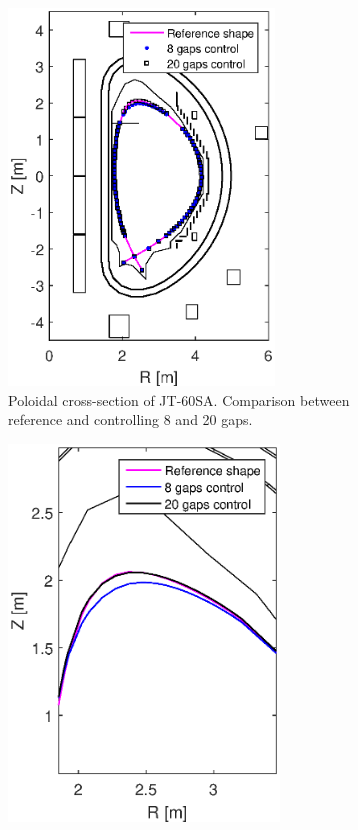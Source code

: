 \begin{figure}[h]
	\centering
	\begin{subfigure}[b]{0.33\textwidth}
		\includegraphics[trim={1.0cm 0cm 1.0cm 0cm},clip,height=10.0cm] {Chp3/Ref_20gaps_8gaps_minor_2.eps}  
		\caption{Poloidal cross-section of JT-60SA. Comparison between reference  and controlling 8 and 20 gaps.\label{figure:minor_big} }
	\end{subfigure}
	\hspace{2cm}
	\begin{subfigure}[b]{0.33\textwidth}
		\includegraphics[trim={0.8cm 0cm 1.25cm 0cm},clip,height=10.0cm]{Chp3/zoom_Ref_20gaps_8gaps_minor_top_2.eps} 

\end{subfigure}
\end{figure}
